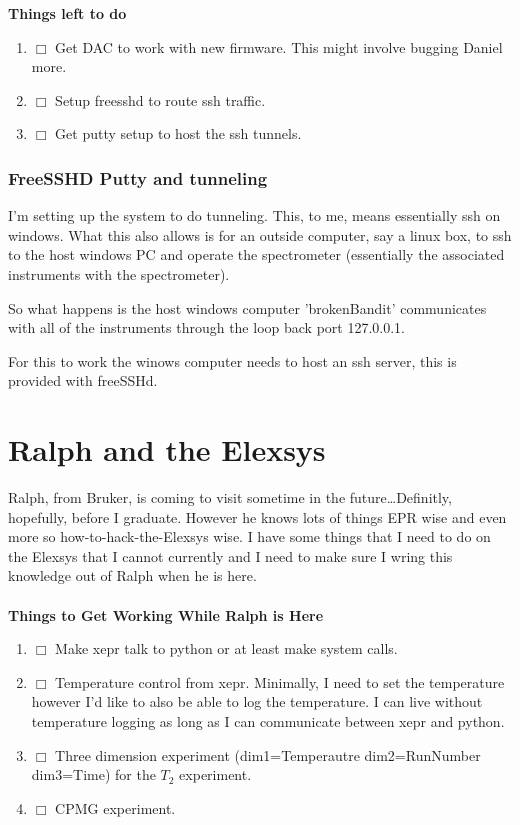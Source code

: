 \documentclass[10pt]{book}
\begin{document}
{\bf Things left to do}
\begin{enumerate}
    \item $\Box$ Get DAC to work with new firmware. This might involve bugging Daniel more.
    \item $\Box$ Setup freesshd to route ssh traffic.
    \item $\Box$ Get putty setup to host the ssh tunnels.
\end{enumerate}

\subsection{FreeSSHD Putty and tunneling}
I'm setting up the system to do tunneling. This, to me, means essentially ssh on windows. What this also allows is for an outside computer, say a linux box, to ssh to the host windows PC and operate the spectrometer (essentially the associated instruments with the spectrometer).

So what happens is the host windows computer 'brokenBandit' communicates with all of the instruments through the loop back port 127.0.0.1.

For this to work the winows computer needs to host an ssh server, this is provided with freeSSHd.


\chapter{Ralph and the Elexsys}
Ralph, from Bruker, is coming to visit sometime in the future\ldots Definitly, hopefully, before I graduate. However he knows lots of things EPR wise and even more so how-to-hack-the-Elexsys wise. I have some things that I need to do on the Elexsys that I cannot currently and I need to make sure I wring this knowledge out of Ralph when he is here.\\ \\

{\bf Things to Get Working While Ralph is Here}
\begin{enumerate}
    \item $\Box$ Make xepr talk to python or at least make system calls.
    \item $\Box$ Temperature control from xepr. Minimally, I need to set the temperature however I'd like to also be able to log the temperature. I can live without temperature logging as long as I can communicate between xepr and python.
    \item $\Box$ Three dimension experiment (dim1=Temperautre dim2=RunNumber dim3=Time) for the $T_2$ experiment.
    \item $\Box$ CPMG experiment.
\end{enumerate}
\end{document}
